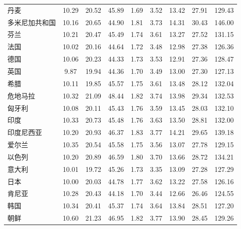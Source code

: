 \begin{mvtable}
\begin{tabular}{lcccccccc}
丹麦 & 10.29 & 20.52 & 45.89 & 1.69 & 3.52 & 13.42 & 27.91 & 129.43 \\
多米尼加共和国 & 10.16 & 20.65 & 44.90 & 1.81 & 3.73 & 14.31 & 30.43 & 146.00 \\
芬兰 & 10.21 & 20.47 & 45.49 & 1.74 & 3.61 & 13.27 & 27.52 & 131.15 \\
法国 & 10.02 & 20.16 & 44.64 & 1.72 & 3.48 & 12.98 & 27.38 & 126.36 \\
德国 & 10.06 & 20.23 & 44.33 & 1.73 & 3.53 & 12.91 & 27.36 & 128.47 \\
英国 & 9.87 & 19.94 & 44.36 & 1.70 & 3.49 & 13.00 & 27.30 & 127.13 \\
希腊 & 10.11 & 19.85 & 45.57 & 1.75 & 3.61 & 13.48 & 28.12 & 132.04 \\
危地马拉 & 10.32 & 21.09 & 48.44 & 1.82 & 3.74 & 13.98 & 29.34 & 132.53 \\
匈牙利 & 10.08 & 20.11 & 45.43 & 1.76 & 3.59 & 13.45 & 28.03 & 132.10 \\
印度 & 10.33 & 20.73 & 45.48 & 1.76 & 3.63 & 13.50 & 28.81 & 132.00 \\
印度尼西亚 & 10.20 & 20.93 & 46.37 & 1.83 & 3.77 & 14.21 & 29.65 & 139.18 \\
爱尔兰 & 10.35 & 20.54 & 45.58 & 1.75 & 3.56 & 13.07 & 27.78 & 129.15 \\
以色列 & 10.20 & 20.89 & 46.59 & 1.80 & 3.70 & 13.66 & 28.72 & 134.21 \\
意大利 & 10.01 & 19.72 & 45.26 & 1.73 & 3.35 & 13.09 & 27.28 & 127.29 \\
日本 & 10.00 & 20.03 & 44.78 & 1.77 & 3.62 & 13.22 & 27.58 & 126.16 \\
肯尼亚 & 10.28 & 20.43 & 44.18 & 1.70 & 3.44 & 12.66 & 26.46 & 124.55 \\
韩国 & 10.34 & 20.41 & 45.37 & 1.74 & 3.64 & 13.84 & 28.51 & 127.20 \\
朝鲜 & 10.60 & 21.23 & 46.95 & 1.82 & 3.77 & 13.90 & 28.45 & 129.26 \\
\bottomrule
\end{tabular}
\end{mvtable}
